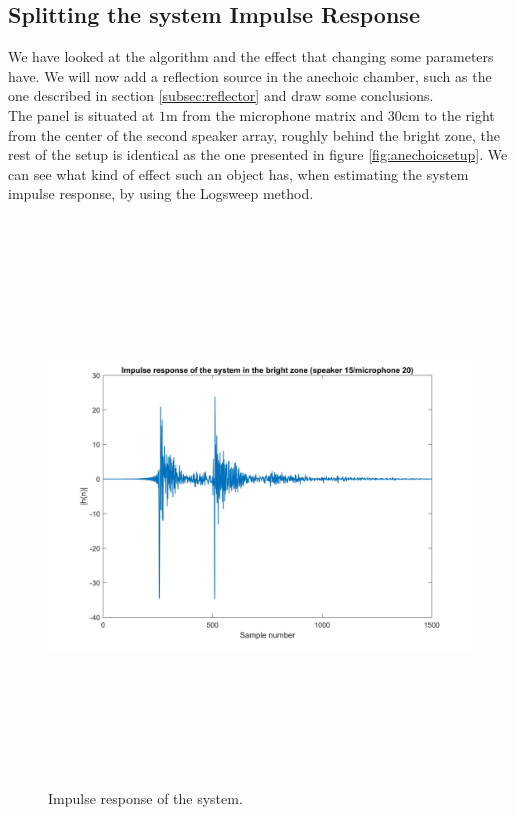 \subsection{Splitting the system Impulse Response}{}
\label{subsec:filtersplit}


We have looked at the algorithm and the effect that changing some parameters have. We will now add a reflection source in the anechoic chamber, such as the one described in section \ref{subsec:reflector} and draw some conclusions.
\\
The panel is situated at $1$m from the microphone matrix and $30$cm to the right from the center of the second speaker array, roughly behind the bright zone, the rest of the setup is identical as the one presented in figure \ref{fig:anechoicsetup}.
We can see what kind of effect such an object has, when estimating the system impulse response, by using the Logsweep method.

\begin{figure}[H]
\centering
\includegraphics[width=15cm,height=15cm,keepaspectratio]{Figures/ir_refl_bright}
\decoRule
\caption[Impulse response]{Impulse response of the system.}
\label{fig:ir_refl_bright}
\end{figure}

